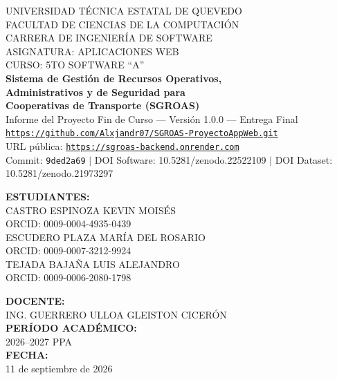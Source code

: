 \begin{titlepage}
\centering
\vspace*{0.6cm}

{\Large UNIVERSIDAD TÉCNICA ESTATAL DE QUEVEDO}\\[0.2cm]
{\Large FACULTAD DE CIENCIAS DE LA COMPUTACIÓN}\\[0.2cm]
{\Large CARRERA DE INGENIERÍA DE SOFTWARE}\\[0.4cm]
{\large ASIGNATURA: APLICACIONES WEB}\\[0.2cm]
{\large CURSO: 5TO SOFTWARE ``A''}\\[1.2cm]

{\LARGE \textbf{Sistema de Gestión de Recursos Operativos,}}\\[0.2cm]
{\LARGE \textbf{Administrativos y de Seguridad para}}\\[0.2cm]
{\LARGE \textbf{Cooperativas de Transporte (SGROAS)}}\\[0.6cm]
{\large Informe del Proyecto Fin de Curso --- Versión 1.0.0 --- Entrega Final}\\[0.4cm]
{\small \texttt{\href{https://github.com/Alxjandr07/SGROAS-ProyectoAppWeb.git}{https://github.com/Alxjandr07/SGROAS-ProyectoAppWeb.git}}}\\[0.2cm]
{\small URL pública: \texttt{\href{https://sgroas-backend.onrender.com}{https://sgroas-backend.onrender.com}}}\\[0.2cm]
{\small Commit: \texttt{9ded2a69} $\vert$ DOI Software: 10.5281/zenodo.22522109 $\vert$ DOI Dataset: 10.5281/zenodo.21973297}\\[1.0cm]

\begin{minipage}{0.5\textwidth}
\centering
\textbf{ESTUDIANTES:}\\[0.4cm]
CASTRO ESPINOZA KEVIN MOISÉS\\
\textsc{ORCID: 0009-0004-4935-0439}\\[0.3cm]
ESCUDERO PLAZA MARÍA DEL ROSARIO\\
\textsc{ORCID: 0009-0007-3212-9924}\\[0.3cm]
TEJADA BAJAÑA LUIS ALEJANDRO\\
\textsc{ORCID: 0009-0006-2080-1798}
\end{minipage}
\hfill
\begin{minipage}{0.4\textwidth}
\centering
\textbf{DOCENTE:}\\[0.4cm]
ING. GUERRERO ULLOA GLEISTON CICERÓN\\[0.8cm]
\textbf{PERÍODO ACADÉMICO:}\\
2026--2027 PPA\\[0.8cm]
\textbf{FECHA:}\\
11 de septiembre de 2026
\end{minipage}

\vfill
\end{titlepage}

